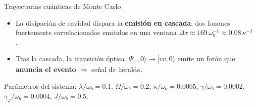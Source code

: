 \documentclass[
11pt,notheorems,hyperref={pdfauthor=whatever}
]{beamer}
\begin{document}
\begin{frame}{Trayectorias cuánticas de Monte Carlo}
	
	\vspace{-15pt}
	
	\begin{center}
		\resizebox{0.63\textwidth}{!}{%
		}
	\end{center}
	
	\vspace{-6pt}
	
	\begin{itemize}
		\item La disipación de cavidad dispara la \textbf{emisión en cascada}:
		dos fonones fuertemente correlacionados emitidos en una ventana
		$\Delta\tau \approx 169\,\omega_b^{-1} \approx 0.08\,\kappa^{-1}$.
		\item Tras la cascada, la transición óptica
		$|\Psi_+,0\rangle \to |vv,0\rangle$ emite un fotón que
		\textbf{anuncia el evento} $\Rightarrow$ señal de heraldo.
	\end{itemize}
	
	\vspace{4pt}
	{\scriptsize
		Parámetros del sistema: $\lambda/\omega_b=0.1$, $\Omega/\omega_b=0.2$,
		$\kappa/\omega_b=0.0005$, $\gamma/\omega_b=0.0002$,
		$\gamma_\varphi/\omega_b=0.0004$, $J/\omega_b=0.5$.
	}
	
\end{frame}
\end{document}
